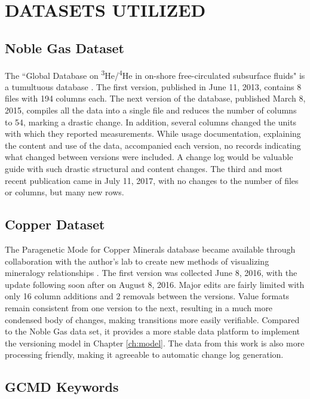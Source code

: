 
\chapter{DATASETS UTILIZED}

\section{Noble Gas Dataset}

The ``Global Database on \textsuperscript{3}He/\textsuperscript{4}He in on-shore free-circulated subsurface fluids" is a tumultuous database \cite{Polyak2015}.
The first version, published in June 11, 2013, contains 8 files with 194 columns each.
The next version of the database, published March 8, 2015, compiles all the data into a single file and reduces the number of columns to 54, marking a drastic change.
In addition, several columns changed the units with which they reported measurements.
While usage documentation, explaining the content and use of the data, accompanied each version, no records indicating what changed between versions were included.
A change log would be valuable guide with such drastic structural and content changes.
The third and most recent publication came in July 11, 2017, with no changes to the number of files or columns, but many new rows.

\section{Copper Dataset}

The Paragenetic Mode for Copper Minerals database became available through collaboration with the author's lab to create new methods of visualizing mineralogy relationships \cite{Morrison2016}.
The first version was collected June 8, 2016, with the update following soon after on August 8, 2016.
Major edits are fairly limited with only 16 column additions and 2 removals between the versions.
Value formats remain consistent from one version to the next, resulting in a much more condensed body of changes, making transitions more easily verifiable.
Compared to the Noble Gas data set, it provides a more stable data platform to implement the versioning model in Chapter \ref{ch:model}.
The data from this work is also more processing friendly, making it agreeable to automatic change log generation.

\section{GCMD Keywords}

